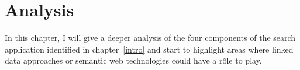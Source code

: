 \chapter{Analysis}
\label{analysis}

In this chapter, I will give a deeper analysis of the four
components of the search application identified in
chapter~\ref{intro} and start to highlight areas where linked data
approaches or semantic web technologies could have a r\^ole to play.




